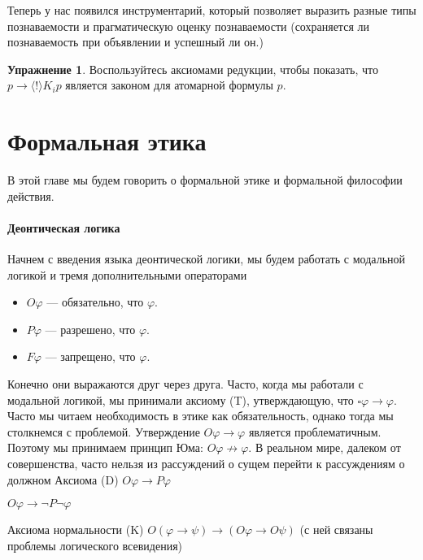 \documentclass[openany]{book}
\theoremstyle{plain}
\theoremstyle{definition}
\newtheorem{xrc}{Упражнение}[]
\begin{document}
Теперь у нас появился инструментарий, который позволяет выразить разные типы познаваемости и прагматическую оценку познаваемости (сохраняется ли познаваемость при объявлении и успешный ли он.)

\begin{xrc}
    Воспользуйтесь аксиомами редукции, чтобы показать, что \(p \to \langle ! \rangle K_i p\) является законом для атомарной формулы \(p\).
\end{xrc}



\chapter{Формальная этика}

В этой главе мы будем говорить о формальной этике и формальной философии действия.

\subsubsection{Деонтическая логика}

Начнем с введения языка деонтической логики, мы будем работать с модальной логикой и тремя дополнительными операторами 
\begin{itemize}
    \item \(O \varphi\) --- обязательно, что \(\varphi\).
    \item \(P \varphi\) --- разрешено, что \(\varphi\).
    \item \(F \varphi\) --- запрещено, что \(\varphi\).
\end{itemize}

Конечно они выражаются друг через друга.
Часто, когда мы работали с модальной логикой, мы принимали аксиому (T), утверждающую, что $\square \varphi \to \varphi$. Часто мы читаем необходимость в этике как обязательность, однако тогда мы столкнемся с проблемой. Утверждение \(O \varphi \to \varphi\) является проблематичным. Поэтому мы принимаем принцип Юма: \(O \varphi \not\to \varphi\). В реальном мире, далеком от совершенства, часто нельзя из рассуждений о сущем перейти к рассуждениям о должном
Аксиома (D) \(O \varphi \to P \varphi\)


\(O \varphi \to \neg P \neg \varphi\)


Аксиома нормальности (K) \(O(\varphi \to \psi) \to (O \varphi \to O \psi) \) (с ней связаны проблемы логического всевидения)
\end{document}
